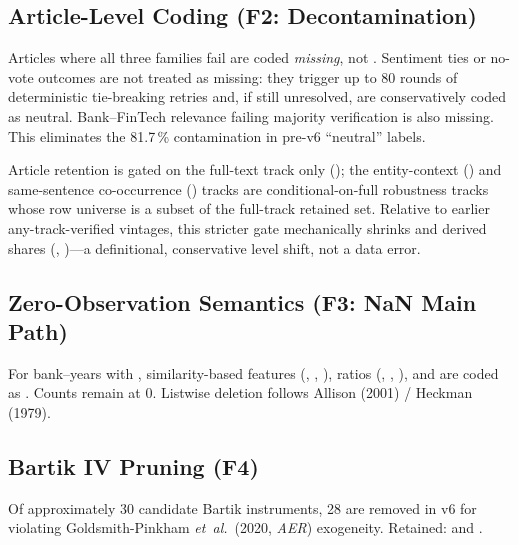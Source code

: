 \subsection{Article-Level Coding (F2: Decontamination)}
Articles where all three families fail are coded \emph{missing}, not
. Sentiment ties or no-vote outcomes are not treated as
missing: they trigger up to 80 rounds of deterministic tie-breaking
retries and, if still unresolved, are conservatively coded as neutral.
Bank--FinTech relevance failing majority verification is also missing.
This eliminates the 81.7\,\%
contamination in pre-v6 ``neutral'' labels.

Article retention is gated on the full-text track only
(); the entity-context () and
same-sentence co-occurrence () tracks are conditional-on-full
robustness tracks whose row universe is a subset of the full-track
retained set. Relative to earlier any-track-verified vintages, this
stricter gate mechanically shrinks  and derived
shares (, )---a
definitional, conservative level shift, not a data error.

\subsection{Zero-Observation Semantics (F3: NaN Main Path)}
For bank--years with , similarity-based features
(, , ),
ratios (, ,
), and  are coded
as . Counts remain at 0. Listwise deletion follows Allison
(2001) / Heckman (1979).

\subsection{Bartik IV Pruning (F4)}
Of approximately 30 candidate Bartik instruments, 28 are removed in v6
for violating Goldsmith-Pinkham \emph{et~al.}\ (2020, \emph{AER})
exogeneity. Retained:  and
.

